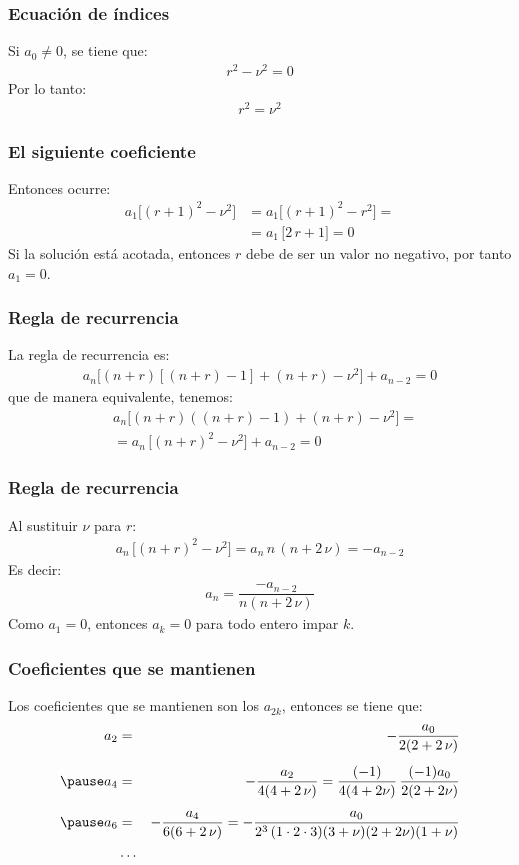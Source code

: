 \documentclass[12pt]{beamer}
\begin{document}
\begin{frame}
\frametitle{Ecuación de índices}
Si $a_{0} \neq 0$, se tiene que:
\pause
\begin{align*}
r^{2} - \nu^{2} = 0
\end{align*}
\pause
Por lo tanto:
\pause
\begin{align*}
r^{2} = \nu^{2}
\end{align*}
\end{frame}
\begin{frame}
\frametitle{El siguiente coeficiente}
Entonces ocurre:
\pause
\begin{align*}
a_{1} \big[ (r + 1)^{2} - \nu^{2} \big] &= a_{1} \big[ (r + 1)^{2} - r^{2} \big] = \\[0.5em]
&= a_{1} \, \big[ 2 \, r + 1 \big] = 0
\end{align*}
\pause
Si la solución está acotada, entonces $r$ debe de ser un valor no negativo, por tanto $a_{1} = 0$.
\end{frame}
\begin{frame}
\frametitle{Regla de recurrencia}
La regla de recurrencia es:
\pause
\begin{align*}
a_{n} \big[ (n + r) \left[ (n + r) - 1 \right] + (n + r) - \nu^{2} \big] + a_{n-2} = 0
\end{align*}
\pause
que de manera equivalente, tenemos:
\pause
\begin{align*}
&a_{n} \big[ (n + r) \left( (n + r) - 1 \right) + (n + r) - \nu^{2} \big] = \\[0.5em]
&= a_{n} \, \big[ (n + r)^{2} - \nu^{2} \big] + a_{n-2} = 0
\end{align*}
\end{frame}
\begin{frame}
\frametitle{Regla de recurrencia}
Al sustituir $\nu$ para $r$:
\pause
\begin{align*}
a_{n} \, \big[ (n + r)^{2} - \nu^{2} \big] = a_{n} \, n \, (n + 2 \, \nu) = - a_{n-2}
\end{align*}
\pause
Es decir:
\pause
\begin{align*}
a_{n} = \dfrac{- a_{n-2}}{n (n + 2 \, \nu)}
\end{align*}
Como $a_{1} = 0$, entonces $a_{k} = 0$ para todo entero impar $k$.
\end{frame}
\begin{frame}
\frametitle{Coeficientes que se mantienen}
Los coeficientes que se mantienen son los $a_{2 k}$, entonces se tiene que:
\pause
\fontsize{12}{12}\selectfont
\begin{eqnarray*}
a_{2} &=& - \dfrac{a_{0}}{2 (2 + 2 \, \nu)} \\[0.5em]\pause
a_{4} &=& - \dfrac{a_{2}}{4 (4 + 2 \, \nu)} = \dfrac{(-1)}{4 (4 + 2 \nu)} \, \dfrac{(-1)a_{0}}{2 (2 + 2 \nu)} \\[0.5em]\pause
a_{6} &=& - \dfrac{a_{4}}{6 (6 + 2 \, \nu)} = - \dfrac{a_{0}}{2^{3} \, (1 \cdot 2 \cdot 3) (3 + \nu)(2 + 2 \nu)(1 + \nu)}\\
&\ldots&
\end{eqnarray*}
\end{frame}
\end{document}
